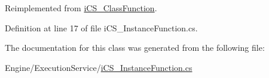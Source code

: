 Reimplemented from \hyperlink{classi_c_s___class_function_aef24f41d4ca85cd54d9fc45c8a428ea1}{i\+C\+S\+\_\+\+Class\+Function}.



Definition at line 17 of file i\+C\+S\+\_\+\+Instance\+Function.\+cs.



The documentation for this class was generated from the following file\+:\begin{DoxyCompactItemize}
\item 
Engine/\+Execution\+Service/\hyperlink{i_c_s___instance_function_8cs}{i\+C\+S\+\_\+\+Instance\+Function.\+cs}\end{DoxyCompactItemize}

